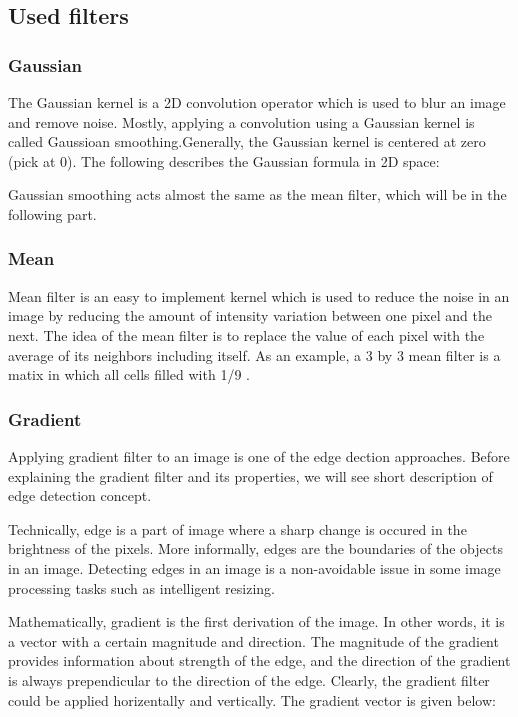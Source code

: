 \documentclass{article}
\begin{document}
		\subsection{Used filters}
		
		\subsubsection{Gaussian}

			The Gaussian kernel is a 2D convolution operator which is used to blur an image and remove noise. Mostly, applying a convolution using a Gaussian
			kernel is called Gaussioan smoothing.Generally, the Gaussian kernel is centered at
			zero (pick at 0). The following describes the Gaussian formula in 2D space:
			
			Gaussian smoothing acts almost the same as the mean filter, which will be in the following part.
		\subsubsection{Mean}
			Mean filter is an easy to implement kernel which is used to reduce the noise in an image by reducing the amount of intensity variation between one
			pixel and the next. The idea of the mean filter is to replace the value of each pixel with the average of its neighbors including itself. As an example,
			a 3 by 3 mean filter is a matix in which all cells filled with 1/9 .	
		
		\subsubsection{Gradient}

			Applying gradient filter to an image is one of the edge dection approaches. Before explaining the gradient filter and its properties, we will see
			short description of edge detection concept. 
			
			Technically, edge is a part of image where a sharp change is occured in the brightness of the pixels.
			More informally, edges are the boundaries of
			the objects in an image. Detecting edges in an image is a non-avoidable issue in some image processing tasks such as intelligent resizing.
			
			Mathematically, gradient is the first derivation of the image. In other words, it is a vector with a certain magnitude and direction. 
			The magnitude of the gradient provides information about strength
			of the edge, and the direction of the gradient is always prependicular to the direction of the edge. Clearly, the gradient filter could be
			applied horizentally and vertically. The gradient vector is given below:
\end{document}

